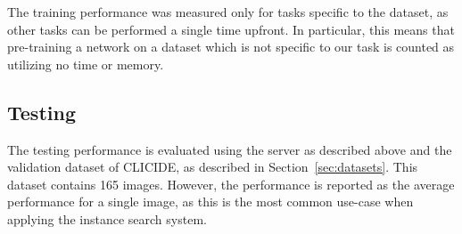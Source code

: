 The training performance was measured only for tasks specific to the dataset,
as other tasks can be performed a single time upfront. In particular, this means
that pre-training a network on a dataset which is not specific to our task is
counted as utilizing no time or memory.
\subsection{Testing}
The testing performance is evaluated using the server as described above and
the validation dataset of CLICIDE, as described in Section~\ref{sec:datasets}.
This dataset contains 165 images. However, the performance is reported
as the average performance for a single image, as this is the most common
use-case when applying the instance search system.
